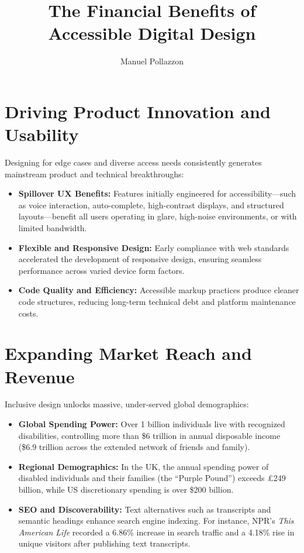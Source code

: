 \documentclass[11pt,a4paper]{article}
\title{\textbf{\Large The Financial Benefits of Accessible Digital Design}}
\author{Manuel Pollazzon}
\date{}
\begin{document}
\maketitle

\section{Driving Product Innovation and Usability}
Designing for edge cases and diverse access needs consistently generates
mainstream product and technical breakthroughs:
\begin{itemize}
  \item \textbf{Spillover UX Benefits:} Features initially engineered for
        accessibility---such as voice interaction, auto-complete,
        high-contrast displays, and structured layouts---benefit all users
        operating in glare, high-noise environments, or with limited
        bandwidth.
  \item \textbf{Flexible and Responsive Design:} Early compliance with web
        standards accelerated the development of responsive design, ensuring
        seamless performance across varied device form factors.
  \item \textbf{Code Quality and Efficiency:} Accessible markup practices
        produce cleaner code structures, reducing long-term technical debt and
        platform maintenance costs.
\end{itemize}

\section{Expanding Market Reach and Revenue}
Inclusive design unlocks massive, under-served global demographics:
\begin{itemize}
  \item \textbf{Global Spending Power:} Over 1 billion individuals live with
        recognized disabilities, controlling more than \$6 trillion in annual
        disposable income (\$6.9 trillion across the extended network of
        friends and family).
  \item \textbf{Regional Demographics:} In the UK, the annual spending power
        of disabled individuals and their families (the ``Purple Pound'')
        exceeds \pounds 249 billion, while US discretionary spending is over
        \$200 billion.
  \item \textbf{SEO and Discoverability:} Text alternatives such as
        transcripts and semantic headings enhance search engine indexing. For
        instance, NPR's \emph{This American Life} recorded a 6.86\% increase
        in search traffic and a 4.18\% rise in unique visitors after
        publishing text transcripts.
\end{itemize}
\end{document}
